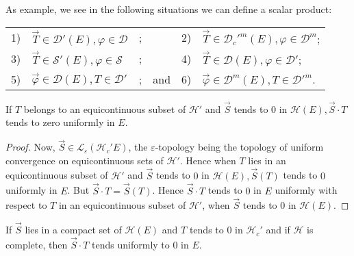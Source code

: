 \noindent As example, we see in the following situations we can define
a scalar product:

\begin{center}
\begin{tabular}{llllll}
1) & $\overrightarrow{T} \in \mathscr{D}'(E), \varphi \in \mathscr{D}$
& ; & & 2) & $\overrightarrow{T} \in \mathscr{D}_c'^m(E), \varphi \in
\mathscr{D}^m$;\\
3) & $\overrightarrow{T} \in \mathscr{S}'(E), \varphi \in \mathscr{S}$
& ; & & 4) & $\overrightarrow{T} \in \mathscr{D}(E), \varphi \in
\mathscr{D}'$;\\
5) & $\overrightarrow{\varphi} \in \mathscr{D}(E), T \in \mathscr{D}'$
& ; & and & 6) & $\overrightarrow{\varphi} \in \mathscr{D}^m(E), T \in
 \mathscr{D}'^m$. 
\end{tabular}
\end{center}


\begin{prop}\label{chap6:prop6.2}
If $T$ belongs to an equicontinuous subset of $\mathscr{H}'$ and
$\overrightarrow{S}$ tends to $0$ in $\mathscr{H}(E),
\overrightarrow{S} \cdot T$ tends to zero uniformly in $E$.
\end{prop}

\begin{proof}
Now, $\overrightarrow{S} \in \mathscr{L}_\varepsilon(\mathscr{H}_c'
E)$, the $\varepsilon$-topology being the topology of uniform
convergence on equicontinuous sets of $\mathscr{H}'$. Hence when $T$
lies in an equicontinuous subset of $\mathscr{H}'$ and
$\overrightarrow{S}$ tends to $0$ in $\mathscr{H}(E),
\overrightarrow{S}(T)$ tends to $0$ uniformly in $E$. But
$\overrightarrow{S} \cdot T = \overrightarrow{S} (T)$. Hence
$\overrightarrow{S} \cdot T$ tends to $0$ in $E$ uniformly with respect to
$T$ in an equicontinuous subset of $\mathscr{H}'$, when
$\overrightarrow{S}$ tends to $0$ in $\mathscr{H} (E)$.
\end{proof}

\begin{prop}\label{chap6:prop6.3}
If $\overrightarrow{S}$ lies in a compact set of $\mathscr{H}(E)$ and
$T$ tends to $0$ in $\mathscr{H}_c'$ and if $\mathscr{H}$ is complete,
then $\overrightarrow{S} \cdot T$ tends uniformly to $0$ in $E$.
\end{prop}

